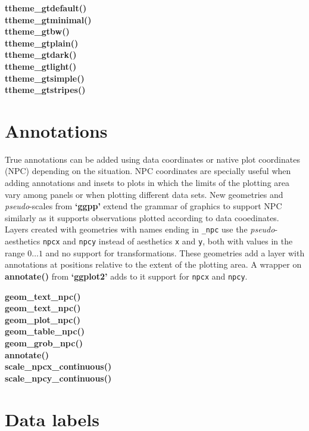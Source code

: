 \documentclass[DIV=21,a3,landscape,9pt]{scrartcl}\usepackage[]{graphicx}\usepackage[]{xcolor}
\begin{document}
\begin{multicols}{3}
\noindent
\textbf{ttheme\_gtdefault()}\\
\textbf{ttheme\_gtminimal()}\\
\textbf{ttheme\_gtbw()}\\
\textbf{ttheme\_gtplain()}\\
\textbf{ttheme\_gtdark()}\\
\textbf{ttheme\_gtlight()}\\
\textbf{ttheme\_gtsimple()}\\
\textbf{ttheme\_gtstripes()}

\section*{Annotations}

True annotations can be added using data coordinates or native plot coordinates (NPC) depending on the situation. NPC coordinates are specially useful when adding annotations and insets to plots in which the limits of the plotting area vary among panels or when plotting different data sets. New geometries and \emph{pseudo}-scales from \textbf{`ggpp'} extend the grammar of graphics to support NPC similarly as it supports observations plotted according to data cooedinates. Layers created with geometries with names ending in \texttt{\_npc} use the \emph{pseudo}-aesthetics \texttt{npcx} and \texttt{npcy} instead of aesthetics \texttt{x} and \texttt{y}, both with values in the range $0\ldots1$ and no support for transformations. These geometries add a layer with annotations at positions relative to the extent of the plotting area. A wrapper on \textbf{annotate()} from \textbf{`ggplot2'} adds to it support for \texttt{npcx} and \texttt{npcy}\textbf{}.\vspace{1ex}

\noindent
\textbf{geom\_text\_npc()}\\
\textbf{geom\_text\_npc()}\\
\textbf{geom\_plot\_npc()}\\
\textbf{geom\_table\_npc()}\\
\textbf{geom\_grob\_npc()}\\
\textbf{annotate()}\\
\textbf{scale\_npcx\_continuous()}\\
\textbf{scale\_npcy\_continuous()}

\section*{Data labels}


\end{multicols}
\end{document}
